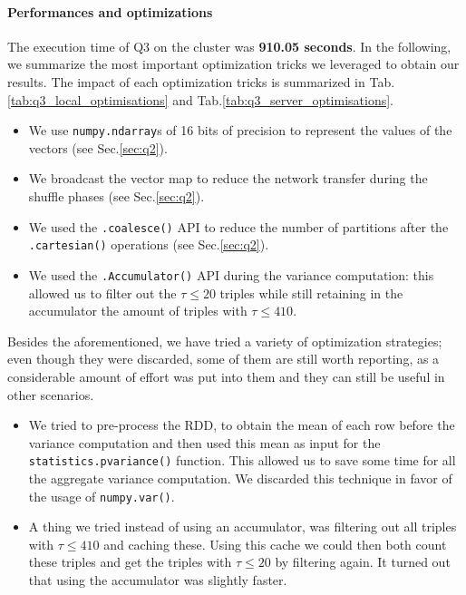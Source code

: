 \paragraph{\textbf{Performances and optimizations}}
The execution time of Q3 on the cluster was \textbf{910.05 seconds}. In the following, we summarize the most important optimization tricks we leveraged to obtain our results. The impact of each optimization tricks is summarized in Tab.\ref{tab:q3_local_optimisations} and Tab.\ref{tab:q3_server_optimisations}.

\begin{itemize}
    \item We use \texttt{numpy.ndarray}s of 16 bits of precision to represent the values of the vectors (see Sec.\ref{sec:q2}).
    \item We broadcast the vector map to reduce the network transfer during the shuffle phases (see Sec.\ref{sec:q2}).
    \item We used the \texttt{.coalesce()} API to reduce the number of partitions after the \texttt{.cartesian()} operations (see Sec.\ref{sec:q2}).
    \item We used the \texttt{.Accumulator()} API during the variance computation: this allowed us to filter out the \(\tau \leq 20\) triples while still retaining in the accumulator the amount of triples with \(\tau \leq 410\).
\end{itemize}

\begin{table}[H]
    \begin{minipage}{.45\textwidth}
    \centering
    
    \end{minipage}
    \hfill
    \begin{minipage}{.5\textwidth}
        \centering
        
    \end{minipage}
\end{table}

Besides the aforementioned, we have tried a variety of optimization strategies; even though they were discarded, some of them are still worth reporting, as a considerable amount of effort was put into them and they can still be useful in other scenarios.
\begin{itemize}
    \item We tried to pre-process the RDD, to obtain the mean of each row before the variance computation and then used this mean as input for the \texttt{statistics.pvariance()} function. This allowed us to save some time for all the aggregate variance computation. We discarded this technique in favor of the usage of \texttt{numpy.var()}.
    \item A thing we tried instead of using an accumulator, was filtering out all triples with \(\tau \leq 410\) and caching these. Using this cache we could then both count these triples and get the triples with \(\tau \leq 20\) by filtering again. It turned out that using the accumulator was slightly faster.
\end{itemize}

